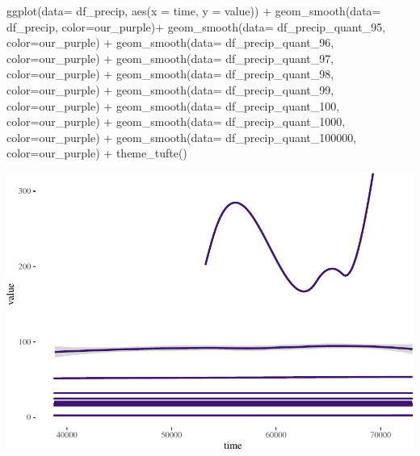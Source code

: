 \documentclass[
  paper=a4,
  ,captions=tableheading
]{scrartcl}
\newenvironment{Shaded}{\begin{snugshade}}{\end{snugshade}}
\newcommand{\AttributeTok}[1]{\textcolor[rgb]{0.77,0.63,0.00}{#1}}
\newcommand{\FunctionTok}[1]{\textcolor[rgb]{0.00,0.00,0.00}{#1}}
\newcommand{\NormalTok}[1]{#1}
\newcommand{\SpecialCharTok}[1]{\textcolor[rgb]{0.00,0.00,0.00}{#1}}
\begin{document}
\begin{Shaded}
\begin{Highlighting}[]
\FunctionTok{ggplot}\NormalTok{(}\AttributeTok{data=}\NormalTok{ df\_precip, }\FunctionTok{aes}\NormalTok{(}\AttributeTok{x =}\NormalTok{ time, }\AttributeTok{y =}\NormalTok{ value)) }\SpecialCharTok{+} 
     \FunctionTok{geom\_smooth}\NormalTok{(}\AttributeTok{data=}\NormalTok{ df\_precip, }\AttributeTok{color=}\NormalTok{our\_purple)}\SpecialCharTok{+} 
     \FunctionTok{geom\_smooth}\NormalTok{(}\AttributeTok{data=}\NormalTok{ df\_precip\_quant\_95, }\AttributeTok{color=}\NormalTok{our\_purple) }\SpecialCharTok{+}
    \FunctionTok{geom\_smooth}\NormalTok{(}\AttributeTok{data=}\NormalTok{ df\_precip\_quant\_96, }\AttributeTok{color=}\NormalTok{our\_purple) }\SpecialCharTok{+}
    \FunctionTok{geom\_smooth}\NormalTok{(}\AttributeTok{data=}\NormalTok{ df\_precip\_quant\_97, }\AttributeTok{color=}\NormalTok{our\_purple) }\SpecialCharTok{+}
    \FunctionTok{geom\_smooth}\NormalTok{(}\AttributeTok{data=}\NormalTok{ df\_precip\_quant\_98, }\AttributeTok{color=}\NormalTok{our\_purple) }\SpecialCharTok{+}
    \FunctionTok{geom\_smooth}\NormalTok{(}\AttributeTok{data=}\NormalTok{ df\_precip\_quant\_99, }\AttributeTok{color=}\NormalTok{our\_purple) }\SpecialCharTok{+}
  \FunctionTok{geom\_smooth}\NormalTok{(}\AttributeTok{data=}\NormalTok{ df\_precip\_quant\_100, }\AttributeTok{color=}\NormalTok{our\_purple) }\SpecialCharTok{+}
  \FunctionTok{geom\_smooth}\NormalTok{(}\AttributeTok{data=}\NormalTok{ df\_precip\_quant\_1000, }\AttributeTok{color=}\NormalTok{our\_purple) }\SpecialCharTok{+}
    \FunctionTok{geom\_smooth}\NormalTok{(}\AttributeTok{data=}\NormalTok{ df\_precip\_quant\_100000, }\AttributeTok{color=}\NormalTok{our\_purple) }\SpecialCharTok{+}
  \FunctionTok{theme\_tufte}\NormalTok{()}
\end{Highlighting}
\end{Shaded}

\includegraphics{Haskell_files/figure-latex/unnamed-chunk-50-1.pdf}
\end{document}
